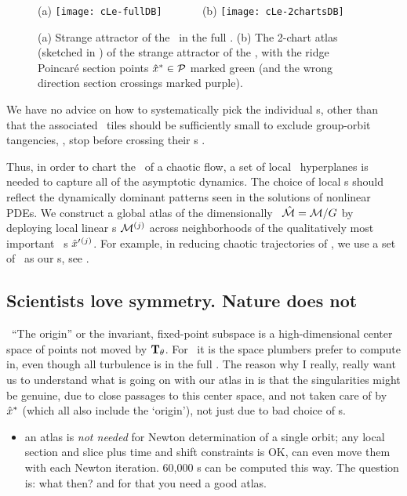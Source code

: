 \begin{figure}
 \begin{center}
(a) \texttt{[image: cLe-fullDB]}
~~~~~~
(b) \texttt{[image: cLe-2chartsDB]}
 \end{center}
  \caption{\label{fig:cLe-2charts}
(a)
Strange attractor of the \cLe\ in the full \statesp.
(b)
The 2-chart atlas (sketched in ) of the strange
attractor of the \cLe, with the ridge Poincar\'e section points
$\hat{x}^* \in {\cal P}$ marked green (and the wrong direction section
crossings marked purple).
  }
\end{figure}

We have no advice on how to
systematically pick the individual \template s, other than that the
associated \slice\ tiles should be sufficiently small to exclude
group-orbit tangencies, \ie, stop before crossing their {\chartBord}s .

Thus, in order to chart the \statesp\ of a chaotic flow, a set
of local \slice\ hyperplanes is needed to capture all of the asymptotic
dynamics. The choice of local \slice s should reflect the dynamically
dominant patterns seen in the solutions of nonlinear PDEs. We construct a
global atlas of the dimensionally \reducedsp\ $\hat{\cal M} = {\cal M}/G$ by
deploying local linear \slice s  ${\cal M}{}^{(j)}$ across neighborhoods of
the qualitatively most important \template\ {\cohStr s}
${\hat{x}'}{}^{(j)}$. For example, in reducing chaotic trajectories of
, we use a set of \reqva\ as our \template s, see
.

    \ifdraft\color{blue}
\subsection{Scientists love symmetry. Nature does not}\
``The origin'' or the invariant, fixed-point subspace is a
high-dimensional center space of points not moved by $\mathbf{T}_{\theta}$. For
\pCf\ it is the space plumbers prefer to compute in, even though all
turbulence is in the full \statesp. The reason why I really, really want
us to understand what is going on with our atlas in 
is that the singularities might be genuine, due to close passages to this
center space, and not taken care of by $\hat{x}^\ast$ (which all also
include the `origin'), not just due to bad choice of \template s.
    \color{black}\fi

    \begin{itemize}
      \item an atlas is \emph{not needed} for Newton determination of a
            single orbit; any local section and slice plus time and shift
            constraints is OK, can even move them with each Newton
            iteration. 60,000 \rpo s can be computed\rf{SCD07} this way.
            The question is: what then? and for that you need a good atlas.
    \end{itemize}
